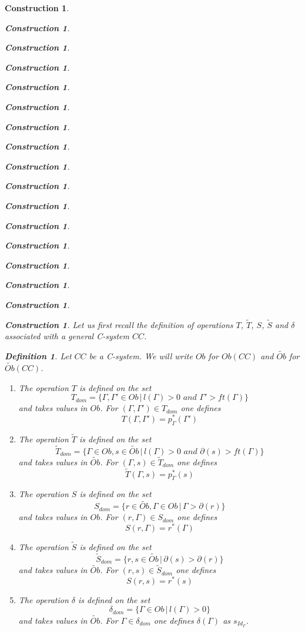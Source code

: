 \documentclass[12pt]{amsart}
\newtheorem{definition}[proposition]{Definition}
\numberwithin{proposition}{subsection}
\newtheorem{construction}[proposition]{Construction}
\newcommand{\llabel}[1]{\label{#1}}
\newcommand{\wt}{\widetilde}
\begin{document}
\begin{construction}
\begin{construction}
\begin{construction}
\begin{construction}
\begin{construction}
\begin{construction}
\begin{construction}
\begin{construction}
\begin{construction}
\begin{construction}
\begin{construction}
\begin{construction}
\begin{construction}
\begin{construction}
\begin{construction}
\begin{construction}
\begin{construction}
Let us first recall the definition of operations $T$, $\wt{T}$, $S$, $\wt{S}$
and $\delta$ associated with a general C-system $CC$.
%
\begin{definition}
\llabel{2015.08.26.def1}
Let $CC$ be a C-system. We will write $Ob$ for $Ob(CC)$ and $\wt{Ob}$ for $\wt{Ob}(CC)$. 
%
%
\begin{enumerate}
\item The operation $T$ is defined on the set
%
$$T_{dom}=\{\Gamma,\Gamma'\in Ob\,|\,l(\Gamma)>0\,\,and\,\, \Gamma'>ft(\Gamma)\}$$
%
and takes values in $Ob$. For $(\Gamma,\Gamma')\in T_{dom}$ one defines
%
$$T(\Gamma,\Gamma')=p_{\Gamma}^*(\Gamma')$$
%
\item The operation $\wt{T}$ is defined on the set
%
$$\wt{T}_{dom}=\{\Gamma\in Ob, s\in \wt{Ob}\,|\,l(\Gamma)>0\,\,and\,\, \partial(s)>ft(\Gamma)\}$$
%
and takes values in $\wt{Ob}$. For $(\Gamma,s)\in \wt{T}_{dom}$ one defines
%
$$\wt{T}(\Gamma,s)=p_{\Gamma}^*(s)$$
%
\item The operation $S$ is defined on the set
%
$$S_{dom}=\{r\in \wt{Ob}, \Gamma\in Ob\,|\,\Gamma>\partial(r)\}$$
%
and takes values in $Ob$. For $(r,\Gamma)\in S_{dom}$ one defines
%
$$S(r,\Gamma)=r^*(\Gamma)$$
%
\item The operation $\wt{S}$ is defined on the set 
%
$$\wt{S}_{dom}=\{r,s\in \wt{Ob}\,|\,\partial(s)>\partial(r)\}$$
%
and takes values in $\wt{Ob}$. For $(r,s)\in \wt{S}_{dom}$ one defines
%
$$S(r,s)=r^*(s)$$
%
\item The operation $\delta$ is defined on the set 
%
$$\delta_{dom}=\{\Gamma\in Ob\,|\,l(\Gamma)>0\}$$
%
and takes values in $\wt{Ob}$. For $\Gamma\in \delta_{dom}$ one defines $\delta(\Gamma)$ as $s_{Id_{\Gamma}}$. 
\end{enumerate}
\end{definition}
%


\end{construction}
\end{construction}
\end{construction}
\end{construction}
\end{construction}
\end{construction}
\end{construction}
\end{construction}
\end{construction}
\end{construction}
\end{construction}
\end{construction}
\end{construction}
\end{construction}
\end{construction}
\end{construction}
\end{construction}
\end{document}
